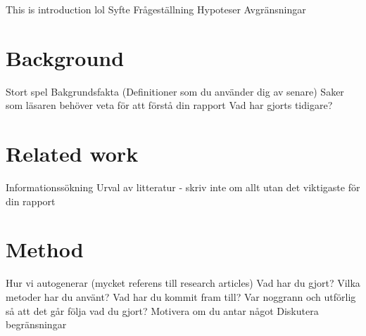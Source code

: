 \documentclass[a4paper]{article}
\begin{document}
This is introduction lol \newline
Syfte \newline
Frågeställning \newline
Hypoteser \newline
Avgränsningar

\section{Background}
Stort spel \newline
Bakgrundsfakta (Definitioner som du använder dig av senare) \newline
Saker som läsaren behöver veta för att förstå din rapport \newline
Vad har gjorts tidigare?

\section{Related work}
Informationssökning \newline
Urval av litteratur - skriv inte om allt utan det viktigaste för din rapport

\section{Method}
Hur vi autogenerar (mycket referens till research articles) \newline
Vad har du gjort? \newline
Vilka metoder har du använt? \newline
Vad har du kommit fram till? \newline
Var noggrann och utförlig så att det går följa vad du gjort? \newline
Motivera om du antar något \newline
Diskutera begränsningar
\end{document}
